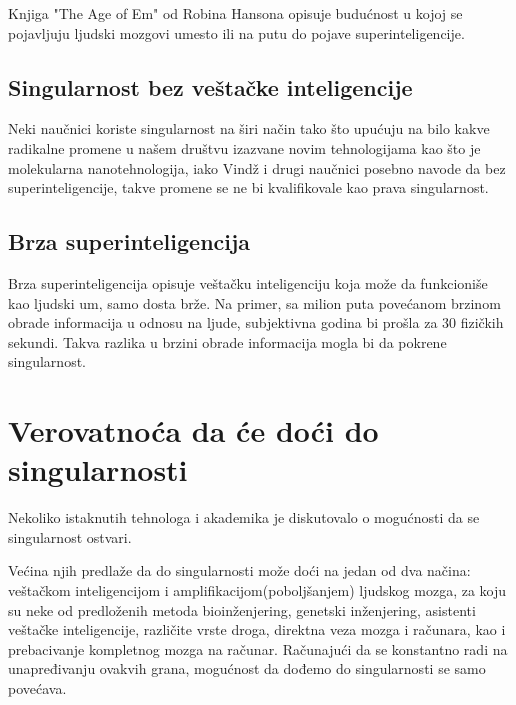 \documentclass[a4paper]{article}
\begin{document}
Knjiga "The Age of Em" od Robina Hansona opisuje budućnost u kojoj se pojavljuju ljudski mozgovi umesto ili na putu do pojave superinteligencije.

\subsection{Singularnost bez veštačke inteligencije}

Neki naučnici koriste singularnost na širi način tako što upućuju na bilo kakve radikalne promene u našem društvu izazvane novim tehnologijama kao što je molekularna nanotehnologija\cite{ref8}, iako Vindž i drugi naučnici posebno navode da bez superinteligencije, takve promene se ne bi kvalifikovale kao prava singularnost.

\subsection{Brza superinteligencija}
Brza superinteligencija opisuje veštačku inteligenciju koja može da funkcioniše kao ljudski um, samo dosta brže. Na primer, sa milion puta povećanom brzinom obrade informacija u odnosu na ljude, subjektivna godina bi prošla za 30 fizičkih sekundi. Takva razlika u brzini obrade informacija mogla bi da pokrene singularnost.

\section{Verovatnoća da će doći do singularnosti}	
\label{sec:verovatnoća}
Nekoliko istaknutih tehnologa i akademika je diskutovalo o mogućnosti da se singularnost ostvari. 

Većina njih predlaže da do singularnosti može doći na jedan od dva načina: veštačkom inteligencijom i amplifikacijom(poboljšanjem) ljudskog mozga, za koju su neke od predloženih metoda bioinženjering, genetski inženjering, asistenti veštačke inteligencije, različite vrste droga, direktna veza mozga i računara, kao i prebacivanje kompletnog mozga na računar. Računajući da se konstantno radi na unapređivanju ovakvih grana, mogućnost da dođemo do singularnosti se samo povećava. 
\end{document}
